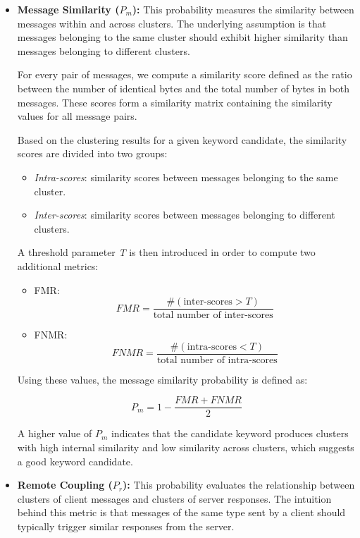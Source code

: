 \begin{itemize}

\item \textbf{Message Similarity ($P_m$):}  
This probability measures the similarity between messages within and across clusters. The underlying assumption is that messages belonging to the same cluster should exhibit higher similarity than messages belonging to different clusters.

For every pair of messages, we compute a similarity score defined as the ratio between the number of identical bytes and the total number of bytes in both messages. These scores form a similarity matrix containing the similarity values for all message pairs.

Based on the clustering results for a given keyword candidate, the similarity scores are divided into two groups:
\begin{itemize}
\item \textit{Intra-scores}: similarity scores between messages belonging to the same cluster.
\item \textit{Inter-scores}: similarity scores between messages belonging to different clusters.
\end{itemize}

A threshold parameter \textit{T} is then introduced in order to compute two additional metrics:

\begin{itemize}
\item \ac{FMR}:
\[
FMR = \frac{\#(\text{inter-scores} > T)}{\text{total number of inter-scores}}
\]

\item \ac{FNMR}:
\[
FNMR = \frac{\#(\text{intra-scores} < T)}{\text{total number of intra-scores}}
\]
\end{itemize}

Using these values, the message similarity probability is defined as:

\[
P_m = 1 - \frac{FMR + FNMR}{2}
\]

A higher value of $P_m$ indicates that the candidate keyword produces clusters with high internal similarity and low similarity across clusters, which suggests a good keyword candidate.

\item \textbf{Remote Coupling ($P_r$):}  
This probability evaluates the relationship between clusters of client messages and clusters of server responses. The intuition behind this metric is that messages of the same type sent by a client should typically trigger similar responses from the server.


\end{itemize}
